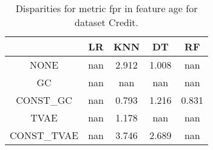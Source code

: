 \begin{table}
\caption{Disparities for metric fpr in feature age for dataset Credit.}
\label{tab:disp-CREDIT-age-fpr}
\begin{tabular}{ccccc}
\toprule
 & LR & KNN & DT & RF \\
\midrule
NONE & nan & 2.912 & 1.008 & nan \\
GC & nan & nan & nan & nan \\
CONST\_GC & nan & 0.793 & 1.216 & 0.831 \\
TVAE & nan & 1.178 & nan & nan \\
CONST\_TVAE & nan & 3.746 & 2.689 & nan \\
\bottomrule
\end{tabular}
\end{table}
